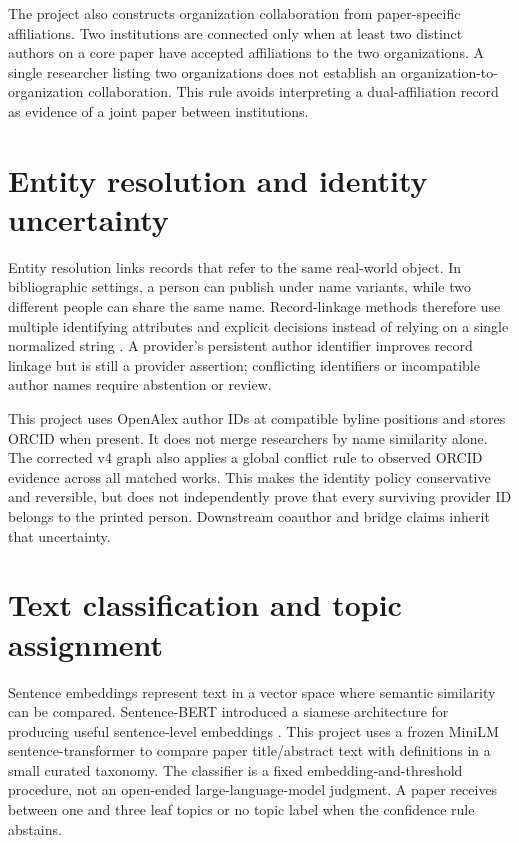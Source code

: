 The project also constructs organization collaboration from paper-specific
affiliations. Two institutions are connected only when at least two distinct
authors on a core paper have accepted affiliations to the two organizations.
A single researcher listing two organizations does not establish an
organization-to-organization collaboration. This rule avoids interpreting a
dual-affiliation record as evidence of a joint paper between institutions.

\section{Entity resolution and identity uncertainty}

Entity resolution links records that refer to the same real-world object. In
bibliographic settings, a person can publish under name variants, while two
different people can share the same name. Record-linkage methods therefore use
multiple identifying attributes and explicit decisions instead of relying on a
single normalized string \citep{christen2012datamatching}. A provider's persistent
author identifier improves record linkage but is still a provider assertion;
conflicting identifiers or incompatible author names require abstention or
review.

This project uses OpenAlex author IDs at compatible byline positions and stores
ORCID when present. It does not merge researchers by name similarity alone.
The corrected v4 graph also applies a global conflict rule to observed ORCID
evidence across all matched works. This makes the identity policy conservative
and reversible, but does not independently prove that every surviving provider
ID belongs to the printed person. Downstream coauthor and bridge claims inherit
that uncertainty.

\section{Text classification and topic assignment}

Sentence embeddings represent text in a vector space where semantic similarity
can be compared. Sentence-BERT introduced a siamese architecture for producing
useful sentence-level embeddings \citep{reimers2019sentencebert}. This project
uses a frozen MiniLM sentence-transformer to compare paper title/abstract text
with definitions in a small curated taxonomy. The classifier is a fixed
embedding-and-threshold procedure, not an open-ended large-language-model
judgment. A paper receives between one and three leaf topics or no topic label
when the confidence rule abstains.

